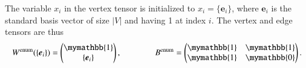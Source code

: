 \documentclass[onefignum, onetabnum]{siamart190516}
\newcommand{\<}{\langle}
\renewcommand{\>}{\rangle}
\begin{document}
The variable $x_{i}$ in the vertex tensor is initialized to $x_i = \{\boldsymbol{e}_{i}\}$, where $\boldsymbol{e}_i$ is the standard basis vector of size $|V|$ and having 1 at index $i$. The vertex and edge tensors are thus
\begin{equation}
    W^{\rm enum}(\{\boldsymbol{e}_{i}\}) = \left(\begin{matrix}
        \mymathbb{1} \\
        \{\boldsymbol{e}_{i}\}
    \end{matrix}\right),   
    \qquad \qquad
        B^{\rm enum} = \left(\begin{matrix}
        \mymathbb{1}  & \mymathbb{1} \\
        \mymathbb{1} & \mymathbb{0}
    \end{matrix}\right).
\end{equation}
\end{document}
